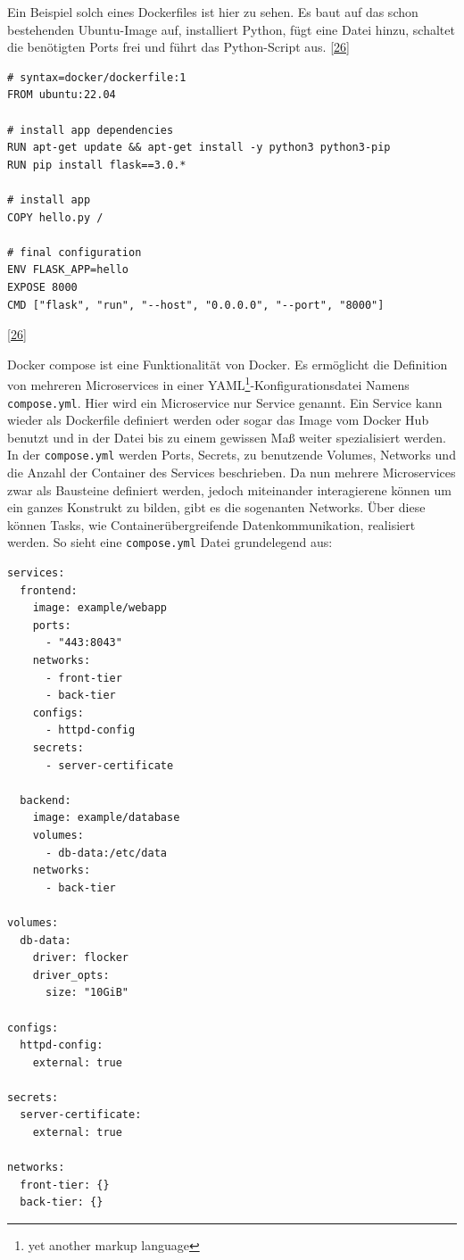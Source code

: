 \documentclass[
    headings=optiontotocandhead,%
    twoside,
    numbers=noenddot,%
    12pt, %
    titlepage, %
    parskip=full, %
    listof=leveldown, 
    numbers=noenddot, %
    a4paper,DIV=14,
    BCOR=15mm,
]{scrbook}
\newcommand{\passthrough}[1]{#1}
\begin{document}
Ein Beispiel solch eines Dockerfiles ist hier zu sehen. Es baut auf das
schon bestehenden Ubuntu-Image auf, installiert Python, fügt eine Datei
hinzu, schaltet die benötigten Ports frei und führt das Python-Script
aus. {[}\protect\hyperlink{ref-docker-dockerfile}{26}{]}

\begin{lstlisting}[caption={Beispiel eines Dockerfiles}]
# syntax=docker/dockerfile:1
FROM ubuntu:22.04

# install app dependencies
RUN apt-get update && apt-get install -y python3 python3-pip
RUN pip install flask==3.0.*

# install app
COPY hello.py /

# final configuration
ENV FLASK_APP=hello
EXPOSE 8000
CMD ["flask", "run", "--host", "0.0.0.0", "--port", "8000"]
\end{lstlisting}

{[}\protect\hyperlink{ref-docker-dockerfile}{26}{]}

Docker compose ist eine Funktionalität von Docker. Es ermöglicht die
Definition von mehreren Microservices in einer
YAML\footnote{yet another markup language}-Konfigurationsdatei Namens
\passthrough{\lstinline!compose.yml!}. Hier wird ein Microservice nur
Service genannt. Ein Service kann wieder als Dockerfile definiert werden
oder sogar das Image vom Docker Hub benutzt und in der Datei bis zu
einem gewissen Maß weiter spezialisiert werden. In der
\passthrough{\lstinline!compose.yml!} werden Ports, Secrets, zu
benutzende Volumes, Networks und die Anzahl der Container des Services
beschrieben. Da nun mehrere Microservices zwar als Bausteine definiert
werden, jedoch miteinander interagierene können um ein ganzes Konstrukt
zu bilden, gibt es die sogenanten Networks. Über diese können Tasks, wie
Containerübergreifende Datenkommunikation, realisiert werden. So sieht
eine \passthrough{\lstinline!compose.yml!} Datei grundelegend aus:

\begin{lstlisting}[caption={Beispiel eines docker compose files}]
services:
  frontend:
    image: example/webapp
    ports:
      - "443:8043"
    networks:
      - front-tier
      - back-tier
    configs:
      - httpd-config
    secrets:
      - server-certificate

  backend:
    image: example/database
    volumes:
      - db-data:/etc/data
    networks:
      - back-tier

volumes:
  db-data:
    driver: flocker
    driver_opts:
      size: "10GiB"

configs:
  httpd-config:
    external: true

secrets:
  server-certificate:
    external: true

networks:
  front-tier: {}
  back-tier: {}
\end{lstlisting}
\end{document}
